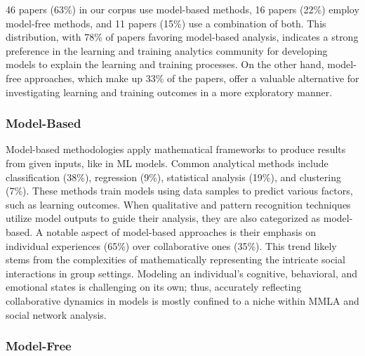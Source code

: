 \documentclass[manuscript,screen,review]{acmart}
\begin{document}
46 papers (63\%) in our corpus use model-based methods, 16 papers (22\%) employ model-free methods, and 11 papers (15\%) use a combination of both. This distribution, with 78\% of papers favoring model-based analysis, indicates a strong preference in the learning and training analytics community for developing models to explain the learning and training processes. On the other hand, model-free approaches, which make up 33\% of the papers, offer a valuable alternative for investigating learning and training outcomes in a more exploratory manner.

\subsubsection{Model-Based}

Model-based methodologies apply mathematical frameworks to produce results from given inputs, like in ML models. Common analytical methods include classification (38\%), regression (9\%), statistical analysis (19\%), and clustering (7\%). These methods train models using data samples to predict various factors, such as learning outcomes. When qualitative and pattern recognition techniques utilize model outputs to guide their analysis, they are also categorized as model-based. A notable aspect of model-based approaches is their emphasis on individual experiences (65\%) over collaborative ones (35\%). This trend likely stems from the complexities of mathematically representing the intricate social interactions in group settings. Modeling an individual's cognitive, behavioral, and emotional states is challenging on its own; thus, accurately reflecting collaborative dynamics in models is mostly confined to a niche within MMLA and social network analysis.



\subsubsection{Model-Free}
\end{document}
